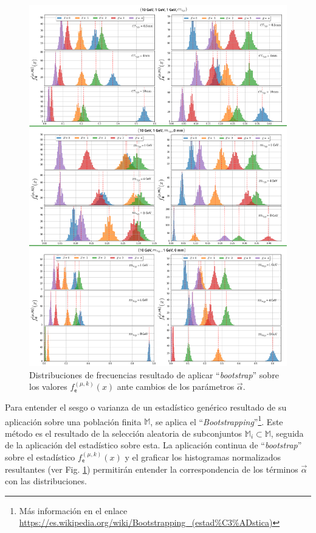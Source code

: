 \begin{figure}[!ht]
\centering
\includegraphics[width=.9\textwidth]{Cap4/imagenes/Distribucion_Entries.png}
\caption{Distribuciones de frecuencias resultado de aplicar ``\textit{bootstrap}'' sobre los valores $f^{(\mu, k)}_\textsf{e} (x)$ ante cambios de los parámetros $\vec{\alpha}$.}
\label{entradas}
\end{figure}

Para entender el sesgo o varianza de un estadístico genérico resultado de su aplicación sobre una población finita $\mathbb{M}$, se aplica el ``\textit{Bootstrapping}''\footnote{Más información en el enlace \href{https://es.wikipedia.org/wiki/Bootstrapping\_(estad\%C3\%ADstica)}{https://\-es.\-wi\-ki\-pe\-dia.\-org/\-wi\-ki/\-Boots\-tra\-pping\_(es\-tad\-\%C3\-\%AD\-sti\-ca)}}. Este método es el resultado de la selección aleatoria de subconjuntos $\mathbb{M}_i\subset \mathbb{M}$, seguida de la aplicación del estadístico sobre esta. La aplicación continua de ``\textit{bootstrap}'' sobre el estadístico $f^{(\mu, k)}_\textsf{e} (x)$ y el graficar los histogramas normalizados resultantes (ver Fig. \ref{entradas}) permitirán entender la correspondencia de los términos $\vec{\alpha}$ con las distribuciones.

